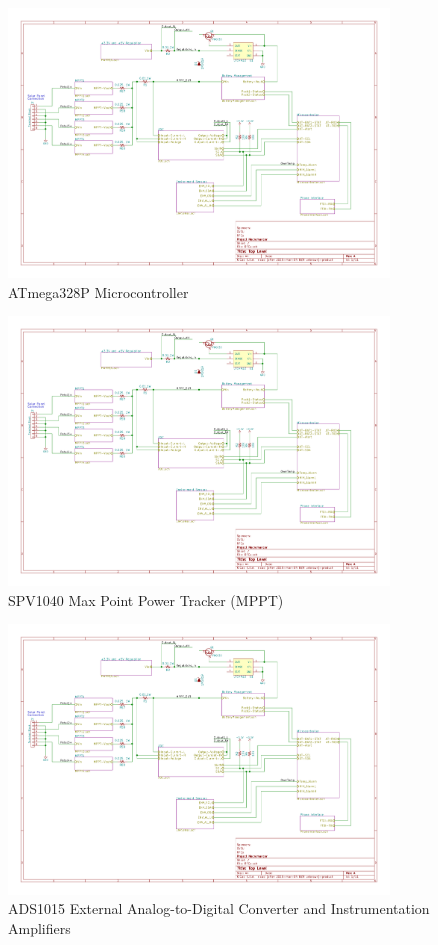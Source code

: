 \documentclass{article}
\numberwithin{figure}{section}
\numberwithin{equation}{section}
\begin{document}
{\begin{figure}[H]
	\centering
	\includegraphics[page=2,width=0.9\textwidth]{RFCxSchematics.pdf}
	\caption{ATmega328P Microcontroller}
	\label{fig:schemp2}
\end{figure}

\begin{figure}[H]
	\centering
	\includegraphics[page=3,width=0.9\textwidth]{RFCxSchematics.pdf}
	\caption{SPV1040 Max Point Power Tracker (MPPT)}
	\label{fig:schemp3}
\end{figure}

\begin{figure}[H]
	\centering
	\includegraphics[page=4,width=0.9\textwidth]{RFCxSchematics.pdf}
	\caption{ADS1015 External Analog-to-Digital Converter and Instrumentation Amplifiers}
	\label{fig:schemp4}
\end{figure}

}
\end{document}
